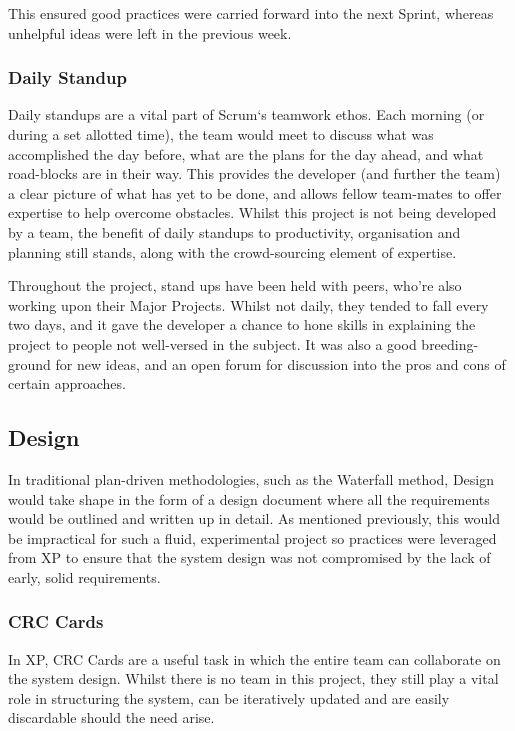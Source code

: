 This ensured good practices were carried forward into the next Sprint, whereas unhelpful ideas were left in the previous week.

\subsubsection{Daily Standup}

Daily standups are a vital part of Scrum`s teamwork ethos. Each morning (or during a set allotted time), the team would meet to discuss what was accomplished the day before, what are the plans for the day ahead, and what road-blocks are in their way. This provides the developer (and further the team) a clear picture of what has yet to be done, and allows fellow team-mates to offer expertise to help overcome obstacles. Whilst this project is not being developed by a team, the benefit of daily standups to productivity, organisation and planning still stands, along with the crowd-sourcing element of expertise.

Throughout the project, stand ups have been held with peers, who're also working upon their Major Projects. Whilst not daily, they tended to fall every two days, and it gave the developer a chance to hone skills in explaining the project to people not well-versed in the subject. It was also a good breeding-ground for new ideas, and an open forum for discussion into the pros and cons of certain approaches.

\subsection{Design}

In traditional plan-driven methodologies, such as the Waterfall method, Design would take shape in the form of a design document where all the requirements would be outlined and written up in detail. As mentioned previously, this would be impractical for such a fluid, experimental project so practices were leveraged from \acrfull{XP} to ensure that the system design was not compromised by the lack of early, solid requirements.

\subsubsection{CRC Cards}

In \acrshort{XP}, \acrfull{CRC} Cards are a useful task in which the entire team can collaborate on the system design. Whilst there is no team in this project, they still play a vital role in structuring the system, can be iteratively updated and are easily discardable should the need arise.

